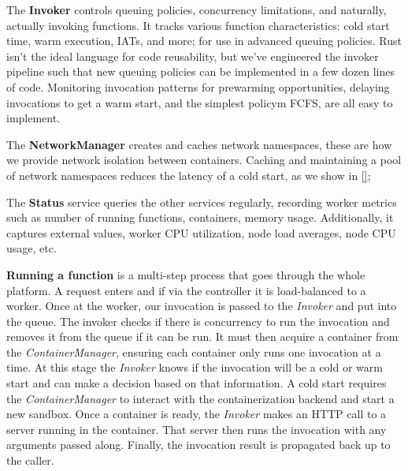 The \textbf{Invoker} controls queuing policies, concurrency limitations, and naturally, actually invoking functions.
It tracks various function characteristics: cold start time, warm execution, IATs, and more; for use in advanced queuing policies.
Rust isn't the ideal language for code reusability, but we've engineered the invoker pipeline such that new queuing policies can be implemented in a few dozen lines of code.
Monitoring invocation patterns for prewarming opportunities, delaying invocations to get a warm start, and the simplest policym FCFS, are all easy to implement.

The \textbf{NetworkManager} creates and caches network namespaces, these are how we provide network isolation between containers.
Caching and maintaining a pool of network namespaces reduces the latency of a cold start, as we show in \ref{};

The \textbf{Status} service queries the other services regularly, recording worker metrics such as number of running functions, containers, memory usage.
Additionally, it captures external values, worker CPU utilization, node load averages, node CPU usage, etc.



\textbf{Running a function} is a multi-step process that goes through the whole platform. %
A request enters \sysname{} and if via the controller it is load-balanced to a worker.
Once at the worker, our invocation is passed to the \emph{Invoker} and put into the queue.
The invoker checks if there is concurrency to run the invocation and removes it from the queue if it can be run.
It must then acquire a container from the \emph{ContainerManager}, ensuring each container only runs one invocation at a time.
At this stage the \emph{Invoker} knows if the invocation will be a cold or warm start and can make a decision based on that information.
A cold start requires the \emph{ContainerManager} to interact with the containerization backend and start a new sandbox.
Once a container is ready, the \emph{Invoker} makes an HTTP call to a server running in the container.
That server then runs the invocation with any arguments passed along.
Finally, the invocation result is propagated back up to the caller.

